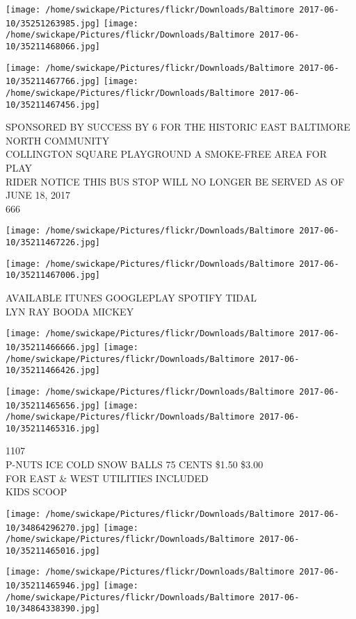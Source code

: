\documentclass[10pt,letterpaper]{article}
\begin{document}
\texttt{[image: /home/swickape/Pictures/flickr/Downloads/Baltimore 2017-06-10/35251263985.jpg]}
\texttt{[image: /home/swickape/Pictures/flickr/Downloads/Baltimore 2017-06-10/35211468066.jpg]}

\texttt{[image: /home/swickape/Pictures/flickr/Downloads/Baltimore 2017-06-10/35211467766.jpg]}
\texttt{[image: /home/swickape/Pictures/flickr/Downloads/Baltimore 2017-06-10/35211467456.jpg]}

SPONSORED BY SUCCESS BY 6 FOR THE HISTORIC EAST BALTIMORE NORTH COMMUNITY\\
COLLINGTON SQUARE PLAYGROUND A SMOKE{-}FREE AREA FOR PLAY\\
RIDER NOTICE THIS BUS STOP WILL NO LONGER BE SERVED AS OF JUNE 18, 2017\\
666
\pagebreak

\texttt{[image: /home/swickape/Pictures/flickr/Downloads/Baltimore 2017-06-10/35211467226.jpg]}

\vspace{0.25in}
\texttt{[image: /home/swickape/Pictures/flickr/Downloads/Baltimore 2017-06-10/35211467006.jpg]}

AVAILABLE ITUNES GOOGLEPLAY SPOTIFY TIDAL\\
LYN RAY BOODA MICKEY
\pagebreak

\texttt{[image: /home/swickape/Pictures/flickr/Downloads/Baltimore 2017-06-10/35211466666.jpg]}
\texttt{[image: /home/swickape/Pictures/flickr/Downloads/Baltimore 2017-06-10/35211466426.jpg]}

\texttt{[image: /home/swickape/Pictures/flickr/Downloads/Baltimore 2017-06-10/35211465656.jpg]}
\texttt{[image: /home/swickape/Pictures/flickr/Downloads/Baltimore 2017-06-10/35211465316.jpg]}

1107\\
P{-}NUTS ICE COLD SNOW BALLS 75 CENTS \$1.50 \$3.00\\
FOR EAST \& WEST UTILITIES INCLUDED\\
KIDS SCOOP
\pagebreak

\texttt{[image: /home/swickape/Pictures/flickr/Downloads/Baltimore 2017-06-10/34864296270.jpg]}
\texttt{[image: /home/swickape/Pictures/flickr/Downloads/Baltimore 2017-06-10/35211465016.jpg]}

\texttt{[image: /home/swickape/Pictures/flickr/Downloads/Baltimore 2017-06-10/35211465946.jpg]}
\texttt{[image: /home/swickape/Pictures/flickr/Downloads/Baltimore 2017-06-10/34864338390.jpg]}
\end{document}
